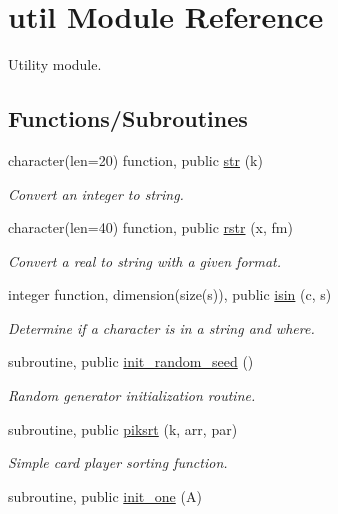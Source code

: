 \hypertarget{namespaceutil}{}\section{util Module Reference}
\label{namespaceutil}


Utility module.  


\subsection*{Functions/\+Subroutines}
\begin{DoxyCompactItemize}
\item 
character(len=20) function, public \hyperlink{namespaceutil_a1df36d0696c9183ceb6bb770f1d88111}{str} (k)
\begin{DoxyCompactList}\small\item\em Convert an integer to string. \end{DoxyCompactList}\item 
character(len=40) function, public \hyperlink{namespaceutil_ac1630658a46867b1f7255eaa51198bf3}{rstr} (x, fm)
\begin{DoxyCompactList}\small\item\em Convert a real to string with a given format. \end{DoxyCompactList}\item 
integer function, dimension(size(s)), public \hyperlink{namespaceutil_a1e2cd46baa2070e28949e28c8a3e037e}{isin} (c, s)
\begin{DoxyCompactList}\small\item\em Determine if a character is in a string and where. \end{DoxyCompactList}\item 
subroutine, public \hyperlink{namespaceutil_a3c2dcf05b068a55f0066d2b393e75dc7}{init\+\_\+random\+\_\+seed} ()
\begin{DoxyCompactList}\small\item\em Random generator initialization routine. \end{DoxyCompactList}\item 
subroutine, public \hyperlink{namespaceutil_af8d0a8ec8cb7391ddbf455dc92f2189d}{piksrt} (k, arr, par)
\begin{DoxyCompactList}\small\item\em Simple card player sorting function. \end{DoxyCompactList}\item 
subroutine, public \hyperlink{namespaceutil_aca7f2465fedb87fef954d8f0c30668c7}{init\+\_\+one} (A)

\end{DoxyCompactItemize}
